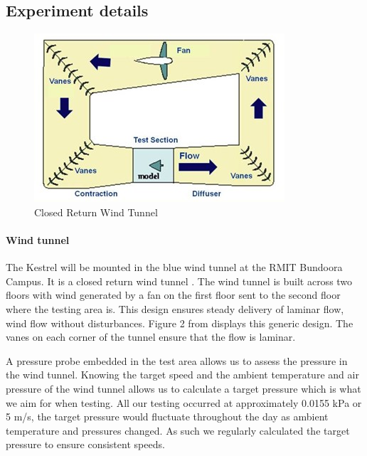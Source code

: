     \subsection{Experiment details}
    \setlength{\intextsep}{0pt}
    \begin{figure}
        \includegraphics[width=\textwidth/2]{./Resources/Fig2_wind_tunnel_design.jpg}
        \caption{\label{fig:figure 2} Closed Return Wind Tunnel \cite{10}}
    \end{figure}
    \paragraph{Wind tunnel}
    The Kestrel will be mounted in the blue wind tunnel at the RMIT
    Bundoora Campus. It is a closed return wind tunnel \cite{11}. The
    wind tunnel is built across two floors with wind generated by a fan on
    the first floor sent to the second floor where the testing area is.
    This design ensures steady delivery of laminar flow, wind flow without
    disturbances. Figure 2 from displays this generic design. The vanes on
    each corner of the tunnel ensure that the flow is laminar. 

    A pressure probe embedded in the test area allows us to assess the
    pressure in the wind tunnel. Knowing the target speed and the ambient
    temperature and air pressure of the wind tunnel allows us to calculate
    a target pressure which is what we aim for when testing. All our testing
    occurred at approximately 0.0155 kPa or 5 m/s, the target pressure would
    fluctuate throughout the day as ambient temperature and pressures
    changed. As such we regularly calculated the target pressure to ensure
    consistent speeds.

